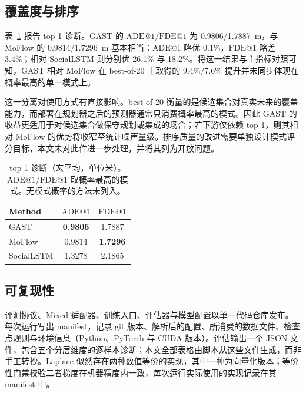 \subsection{覆盖度与排序}
\label{sec:coverage}

表~\ref{tab:top1} 报告 top-1 诊断。GAST 的 $\mathrm{ADE@1}$/$\mathrm{FDE@1}$ 为 0.9806/1.7887~m，与 MoFlow 的 0.9814/1.7296~m 基本相当：$\mathrm{ADE@1}$ 略优 0.1\%，$\mathrm{FDE@1}$ 略差 3.4\%；相对 SocialLSTM 则分别优 26.1\% 与 18.2\%。将这一结果与主指标对照可知，GAST 相对 MoFlow 在 best-of-20 上取得的 9.4\%/7.6\% 提升并未同步体现在概率最高的单一模式上。

这一分离对使用方式有直接影响。best-of-20 衡量的是候选集合对真实未来的覆盖能力，而部署在规划器之后的预测器通常只消费概率最高的模式。因此 GAST 的收益更适用于对候选集合做保守规划或集成的场合；若下游仅依赖 top-1，则其相对 MoFlow 的优势将收窄至统计噪声量级。排序质量的改进需要单独设计模式评分目标，本文未对此作进一步处理，并将其列为开放问题。

\begin{table}[t]
\centering
\footnotesize
\setlength{\tabcolsep}{4.2pt}
\caption{top-1 诊断（宏平均，单位米）。$\mathrm{ADE@1}$/$\mathrm{FDE@1}$ 取概率最高的模式。无模式概率的方法未列入。}
\label{tab:top1}
\begin{tabular}{@{}lcc@{}}
\toprule
Method & $\mathrm{ADE@1}$ & $\mathrm{FDE@1}$ \\
\midrule
GAST & \textbf{0.9806} & 1.7887 \\
MoFlow & 0.9814 & \textbf{1.7296} \\
SocialLSTM & 1.3278 & 2.1865 \\
\bottomrule
\end{tabular}
\end{table}

\subsection{可复现性}
\label{sec:repro}

评测协议、Mixed 适配器、训练入口、评估器与模型配置以单一代码仓库发布。每次运行写出 manifest，记录 git 版本、解析后的配置、所消费的数据文件、检查点规则与环境信息（Python、PyTorch 与 CUDA 版本）。评估输出一个 JSON 文件，包含五个分层维度的逐样本诊断；本文全部表格由脚本从这些文件生成，而非手工转抄。Laplace 似然存在两种数值等价的实现，其中一种为向量化版本；等价性门禁校验二者梯度在机器精度内一致，每次运行实际使用的实现记录在其 manifest 中。
